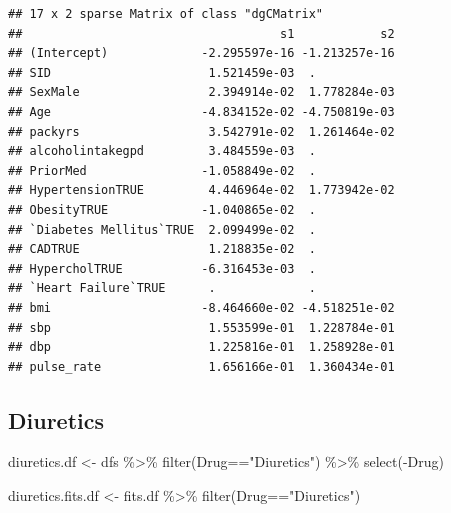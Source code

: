 \documentclass[
]{article}
\newenvironment{Shaded}{\begin{snugshade}}{\end{snugshade}}
\newcommand{\FloatTok}[1]{\textcolor[rgb]{0.00,0.00,0.81}{#1}}
\newcommand{\FunctionTok}[1]{\textcolor[rgb]{0.00,0.00,0.00}{#1}}
\newcommand{\NormalTok}[1]{#1}
\newcommand{\OtherTok}[1]{\textcolor[rgb]{0.56,0.35,0.01}{#1}}
\newcommand{\SpecialCharTok}[1]{\textcolor[rgb]{0.00,0.00,0.00}{#1}}
\newcommand{\StringTok}[1]{\textcolor[rgb]{0.31,0.60,0.02}{#1}}
\begin{document}
\begin{Shaded}
\end{Shaded}

\begin{verbatim}
## 17 x 2 sparse Matrix of class "dgCMatrix"
##                                    s1            s2
## (Intercept)             -2.295597e-16 -1.213257e-16
## SID                      1.521459e-03  .           
## SexMale                  2.394914e-02  1.778284e-03
## Age                     -4.834152e-02 -4.750819e-03
## packyrs                  3.542791e-02  1.261464e-02
## alcoholintakegpd         3.484559e-03  .           
## PriorMed                -1.058849e-02  .           
## HypertensionTRUE         4.446964e-02  1.773942e-02
## ObesityTRUE             -1.040865e-02  .           
## `Diabetes Mellitus`TRUE  2.099499e-02  .           
## CADTRUE                  1.218835e-02  .           
## HypercholTRUE           -6.316453e-03  .           
## `Heart Failure`TRUE      .             .           
## bmi                     -8.464660e-02 -4.518251e-02
## sbp                      1.553599e-01  1.228784e-01
## dbp                      1.225816e-01  1.258928e-01
## pulse_rate               1.656166e-01  1.360434e-01
\end{verbatim}

\hypertarget{diuretics}{%
\subsection{Diuretics}\label{diuretics}}

\begin{Shaded}
\begin{Highlighting}[]
\NormalTok{diuretics.df }\OtherTok{\textless{}{-}}\NormalTok{ dfs }\SpecialCharTok{\%\textgreater{}\%} 
  \FunctionTok{filter}\NormalTok{(Drug}\SpecialCharTok{==}\StringTok{"Diuretics"}\NormalTok{) }\SpecialCharTok{\%\textgreater{}\%} 
  \FunctionTok{select}\NormalTok{(}\SpecialCharTok{{-}}\NormalTok{Drug)}
\end{Highlighting}
\end{Shaded}

\begin{Shaded}
\begin{Highlighting}[]
\NormalTok{diuretics.fits.df }\OtherTok{\textless{}{-}}\NormalTok{ fits.df }\SpecialCharTok{\%\textgreater{}\%} 
  \FunctionTok{filter}\NormalTok{(Drug}\SpecialCharTok{==}\StringTok{"Diuretics"}\NormalTok{)}
\end{Highlighting}
\end{Shaded}
\end{document}
